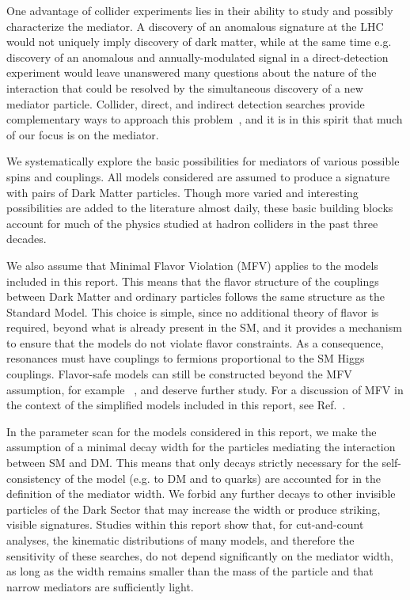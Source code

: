 One advantage of collider experiments lies in their ability to study
and possibly characterize the mediator. A discovery of an anomalous
\MET signature at the LHC would not uniquely imply discovery of dark
matter, while at the same time e.g. discovery of an anomalous and
annually-modulated signal in a direct-detection experiment would leave
unanswered many questions about the nature of the interaction that
could be resolved by the simultaneous discovery of a new mediator
particle. Collider, direct, and indirect detection searches provide
complementary ways to approach this problem~\cite{Bauer:2013ihz}, and it is in this spirit
that much of our focus is on the mediator.

We systematically explore the basic possibilities for
mediators of various possible spins and couplings.
All models considered are assumed to produce a signature with pairs of Dark Matter particles.
Though more varied and
interesting possibilities are added to the literature almost daily,
these basic building blocks account for much of the physics studied at
hadron colliders in the past three decades.

We also assume that Minimal Flavor Violation (MFV) \cite{Chivukula:1987py,Hall:1990ac,Buras:2000dm,D'Ambrosio:2002ex} applies to the
models included in this report. This means that the flavor structure of the
couplings between Dark Matter and ordinary particles follows the same
structure as the Standard Model. This choice is simple, since no
additional theory of flavor is required, beyond what is already
present in the SM, and it provides a mechanism to ensure that the
models do not violate flavor constraints.  As a consequence, \spinzero
resonances must have couplings to fermions proportional to the SM Higgs couplings. 
Flavor-safe models can still be constructed beyond the MFV
assumption, for example ~\cite{Agrawal:2014aoa}, and deserve further study.
For a discussion of MFV in the context of the simplified models
included in this report, see Ref.~\cite{DMatLHCProceedings}.

In the parameter scan for the models considered in this report, we make the
assumption of a minimal decay width for the particles mediating the
interaction between SM and DM.  This means that only decays
strictly necessary for the self-consistency of the model (e.g.  to DM
and to quarks) are accounted for in the definition of the mediator
width. We forbid any further decays to other invisible particles of
the Dark Sector that may increase the width or produce striking, visible signatures. 
Studies within this report show that, for cut-and-count analyses, the kinematic distributions of
many models, and therefore the sensitivity of these searches, do not depend
significantly on the mediator width, as long as the width remains smaller
than the mass of the particle and that narrow mediators are sufficiently light.


